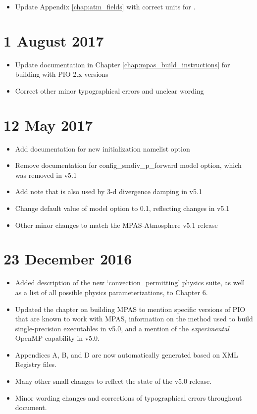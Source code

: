 \begin{itemize}
\item Update Appendix \ref{chap:atm_fields} with correct units for .
\end{itemize}

\section*{1 August 2017}

\begin{itemize}
\item Update documentation in Chapter \ref{chap:mpas_build_instructions} for building with PIO 2.x versions
\item Correct other minor typographical errors and unclear wording
\end{itemize}

\section*{12 May 2017}

\begin{itemize}
\item Add documentation for new  initialization namelist option
\item Remove documentation for config\_smdiv\_p\_forward model option, which was removed in v5.1
\item Add note that  is also used by 3-d divergence damping in v5.1
\item Change default value of  model option to 0.1, reflecting changes in v5.1
\item Other minor changes to match the MPAS-Atmosphere v5.1 release
\end{itemize}

\section*{23 December 2016}

\begin{itemize}
\item Added description of the new `convection\_permitting' physics suite, as well as
a list of all possible physics parameterizations, to Chapter 6.
\item Updated the chapter on building MPAS to mention specific versions of PIO that are known
to work with MPAS, information on the method used to build single-precision executables in v5.0,
and a mention of the {\em experimental} OpenMP capability in v5.0.
\item Appendices A, B, and D are now automatically generated based on XML Registry files.
\item Many other small changes to reflect the state of the v5.0 release.
\item Minor wording changes and corrections of typographical errors throughout document.
\end{itemize}

